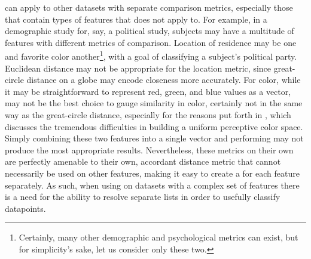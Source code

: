 \krap{} can apply to other datasets with separate comparison metrics, especially those that contain types of features that \euclid{} does not apply to.
For example, in a demographic study for, say, a political study, subjects may have a multitude of features with different metrics of comparison.
Location of residence may be one and favorite color another\footnote{Certainly, many other demographic and psychological metrics can exist, but for simplicity's sake, let us consider only these two.}, with a goal of classifying a subject's political party.
Euclidean distance may not be appropriate for the location metric, since great-circle distance on a globe may encode closeness more accurately.
For color, while it may be straightforward to represent red, green, and blue values as a vector, \euclid{} may not be the best choice to gauge similarity in color, certainly not in the same way as the great-circle distance, especially for the reasons put forth in \cite{mcleod2014proof}, which discusses the tremendous difficulties in building a uniform perceptive color space.
Simply combining these two features into a single vector and performing \euclid{} may not produce the most appropriate results.
Nevertheless, these metrics on their own are perfectly amenable to their own, accordant distance metric that cannot necessarily be used on other features, making it easy to create a \kNN{} for each feature separately.
As such, when using \kNN{} on datasets with a complex set of features there is a need for the ability to resolve separate \kNN{} lists in order to usefully classify datapoints.